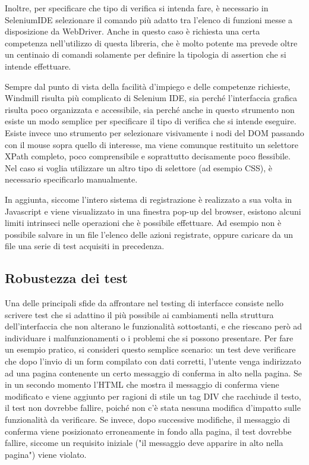 \documentclass[12pt]{toptesi}
\begin{document}
Inoltre, per specificare che tipo di verifica si intenda fare, è necessario in SeleniumIDE selezionare il comando più adatto tra l'elenco di funzioni messe a disposizione da WebDriver. Anche in questo caso è richiesta una certa competenza nell'utilizzo di questa libreria, che è molto potente ma prevede oltre un centinaio di comandi solamente per definire la tipologia di assertion che si intende effettuare.

Sempre dal punto di vista della facilità d'impiego e delle competenze richieste, Windmill risulta più complicato di Selenium IDE, sia perché l'interfaccia grafica risulta poco organizzata e accessibile, sia perché anche in questo strumento non esiste un modo semplice per specificare il tipo di verifica che si intende eseguire. Esiste invece uno strumento per selezionare visivamente i nodi del DOM passando con il mouse sopra quello di interesse, ma viene comunque restituito un selettore XPath completo, poco comprensibile e soprattutto decisamente poco flessibile. Nel caso si voglia utilizzare un altro tipo di selettore (ad esempio CSS), è necessario specificarlo manualmente.

In aggiunta, siccome l'intero sistema di registrazione è realizzato a sua volta in Javascript e viene visualizzato in una finestra pop-up del browser, esistono alcuni limiti intrinseci nelle operazioni che è possibile effettuare. Ad esempio non è possibile salvare in un file l'elenco delle azioni registrate, oppure caricare da un file una serie di test acquisiti in precedenza.

\subsection{Robustezza dei test}

Una delle principali sfide da affrontare nel testing di interfacce consiste nello scrivere test che si adattino il più possibile ai cambiamenti nella struttura dell'interfaccia che non alterano le funzionalità sottostanti, e che riescano però ad individuare i malfunzionamenti o i problemi che si possono presentare. Per fare un esempio pratico, si consideri questo semplice scenario: un test deve verificare che dopo l'invio di un form compilato con dati corretti, l'utente venga indirizzato ad una pagina contenente un certo messaggio di conferma in alto nella pagina. Se in un secondo momento l'HTML che mostra il messaggio di conferma viene modificato e viene aggiunto per ragioni di stile un tag DIV che racchiude il testo, il test non dovrebbe fallire, poiché non c'è stata nessuna modifica d'impatto sulle funzionalità da verificare. Se invece, dopo successive modifiche, il messaggio di conferma viene posizionato erroneamente in fondo alla pagina, il test dovrebbe fallire, siccome un requisito iniziale ("il messaggio deve apparire in alto nella pagina") viene violato.
\end{document}
